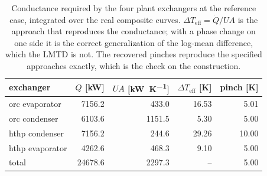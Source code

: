 \begin{table}[htbp]
\centering
\caption{Conductance required by the four plant exchangers at the reference case, integrated over the real composite curves. $\Delta T_\mathrm{eff}=\dot Q/UA$ is the approach that reproduces the conductance; with a phase change on one side it is the correct generalization of the log-mean difference, which the LMTD is not. The recovered pinches reproduce the specified approaches exactly, which is the check on the construction.}
\label{tab:UA}
\small
\begin{tabular}{@{}l r r r r@{}}
\toprule
exchanger & $\dot Q$ [\si{\kilo\watt}] & $UA$ [\si{\kilo\watt\per\kelvin}] & $\Delta T_\mathrm{eff}$ [\si{\kelvin}] & pinch [\si{\kelvin}] \\
\midrule
orc evaporator & 7156.2 & 433.0 & 16.53 & 5.01 \\
orc condenser & 6103.6 & 1151.5 & 5.30 & 5.00 \\
hthp condenser & 7156.2 & 244.6 & 29.26 & 10.00 \\
hthp evaporator & 4262.6 & 468.3 & 9.10 & 5.00 \\
\midrule
total & 24678.6 & 2297.3 & -- & 5.00 \\
\bottomrule
\end{tabular}
\end{table}
